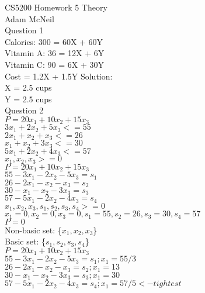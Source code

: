 \documentclass{article}
\begin{document}
CS5200 Homework 5 Theory \\
Adam McNeil \\
Question 1 \\
Calories: 300 = 60X + 60Y \\
Vitamin A: 36 = 12X + 6Y \\ 
Vitamin C: 90 = 6X + 30Y \\
Cost = 1.2X + 1.5Y
Solution:\\
X = 2.5 cups\\
Y = 2.5 cups\\

Question 2\\
${P = 20x_1 + 10x_2 + 15x_3}$ \\
${     3x_1 +  2x_2 +  5x_3 <= 55}$\\
${     2x_1 +   x_2 +   x_3 <= 26}$\\
${      x_1 +   x_2 +  3x_3 <= 30}$\\
${     5x_1 +  2x_2 +  4x_3 <= 57}$\\
${      x_1 ,   x_2 ,   x_3 >=  0}$\\


${P = 20x_1 + 10x_2 + 15x_3}$ \\
${     55 - 3x_1 -  2x_2 -  5x_3 = s_1}$\\
${     26 - 2x_1 -   x_2 -   x_3 = s_2}$\\
${     30 -  x_1 -   x_2 -  3x_3 = s_3}$\\
${     57 - 5x_1 -  2x_2 -  4x_3 = s_4}$\\
${      x_1 ,   x_2 ,   x_3, s_1, s_2, s_3, s_4 >=  0}$\\

${      x_1 = 0, x_2 = 0, x_3 = 0, s_1 = 55, s_2 = 26, s_3 = 30, s_4 = 57}$\\
${P = 0}$\\
Non-basic set: \{${x_1, x_2, x_3}$\}\\
Basic set: \{${s_1, s_2, s_3, s_4}$\}\\

${P = 20x_1 + 10x_2 + 15x_3}$ \\
${     55 - 3x_1 -  2x_2 -  5x_3 = s_1; x_1 = 55/3}$\\
${     26 - 2x_1 -   x_2 -   x_3 = s_2; x_1 = 13}$\\
${     30 -  x_1 -   x_2 -  3x_3 = s_3; x_1 = 30}$\\
${     57 - 5x_1 -  2x_2 -  4x_3 = s_4; x_1 = 57/5 <- tightest}$\\
\end{document}
